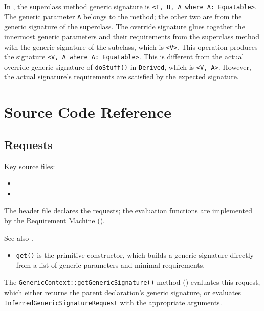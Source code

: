 \documentclass[../generics]{subfiles}
\begin{document}
\begin{example} In , the superclass method generic signature is \texttt{<T, U, A where A: Equatable>}. The generic parameter \texttt{A} belongs to the method; the other two are from the generic signature of the superclass. The override signature glues together the innermost generic parameters and their requirements from the superclass method with the generic signature of the subclass, which is \texttt{<V>}. This operation produces the signature \texttt{<V, A where A:\ Equatable>}. This is different from the actual override generic signature of \texttt{doStuff()} in \texttt{Derived}, which is \texttt{<V, A>}. However, the actual signature's requirements are satisfied by the expected signature.
\end{example}

\fi

\section{Source Code Reference}\label{src:building generic signatures}

\subsection*{Requests}

Key source files:
\begin{itemize}
\item {}
\item {}
\end{itemize}

The header file declares the requests; the evaluation functions are implemented by the Requirement Machine ().

See also .
\begin{itemize}
\item \texttt{get()} is the primitive constructor, which builds a generic signature directly from a list of generic parameters and minimal requirements.
\end{itemize}

The \texttt{GenericContext::getGenericSignature()} method () evaluates this request, which either returns the parent declaration's generic signature, or evaluates \texttt{InferredGenericSignatureRequest} with the appropriate arguments.
\end{document}
